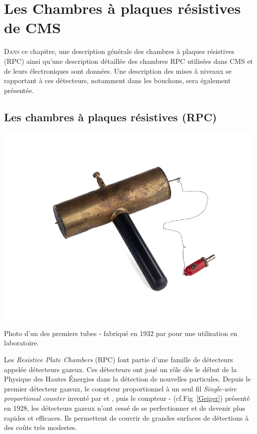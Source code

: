\chapter{Les Chambres à plaques résistives de CMS}
\renewcommand\chapterillustration{RPC/rpc}
\ThisULCornerWallPaper{1}{\chapterillustration}
\minitoc
\label{chap4}
\lettrine[lines=4, slope=-0.5em]{D}{ans} ce chapitre, une description générale des chambres à plaques résistives (RPC) ainsi qu'une description détaillée des chambres RPC utilisées dans CMS et de leurs électroniques sont données. Une description des mises à niveaux se rapportant à ces détecteurs, notamment dans les bouchons, sera également présentée.

\section{Les chambres à plaques résistives (RPC)}

 \marginpar
{
	\centering
	\includegraphics[width=\marginparwidth]{RPC/Geiger.png}
	\captionsetup{type=figure}\caption{Photo d'un des premiers tubes - fabriqué en \num{1932} par  pour une utilisation en laboratoire.}
	\label{Geiger}
}
Les \textit{Resistive Plate Chambers} (RPC) font partie d'une famille de détecteurs appelée détecteurs gazeux. Ces détecteurs ont joué un rôle dès le début de la Physique des Hautes Énergies dans la détection de nouvelles particules. Depuis le premier détecteur gazeux, le compteur proportionnel à un seul fil \textit{Single-wire proportional counter} inventé par  et , puis le compteur - (cf.Fig~\ref{Geiger}) présenté en \num{1928}, les détecteurs gazeux n'ont cessé de se perfectionner et de devenir plus rapides et efficaces. Ils permettent de couvrir de grandes surfaces de détections à des coûts très modestes.


